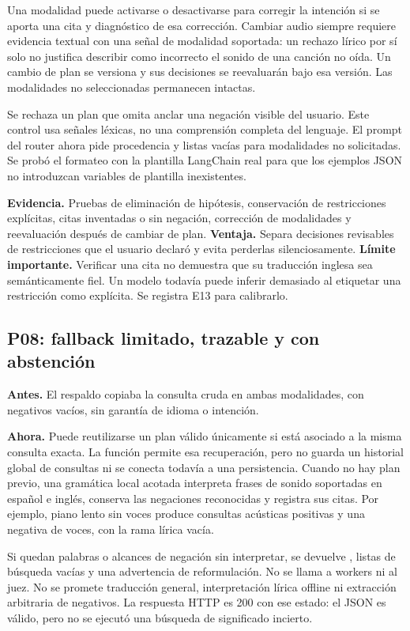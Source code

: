 Una modalidad puede activarse o desactivarse para corregir la intención si se
aporta una cita y diagnóstico de esa corrección. Cambiar audio siempre requiere
evidencia textual con una señal de modalidad soportada: un rechazo lírico por
sí solo no justifica describir como incorrecto el sonido de una canción no oída.
Un cambio de plan se versiona y sus decisiones se reevaluarán bajo esa versión.
Las modalidades no seleccionadas permanecen intactas.

Se rechaza un plan que omita anclar una negación visible del usuario. Este
control usa señales léxicas, no una comprensión completa del lenguaje. El prompt
del router ahora pide procedencia y listas vacías para modalidades no solicitadas.
Se probó el formateo con la plantilla LangChain real para que los ejemplos JSON
no introduzcan variables de plantilla inexistentes.

\textbf{Evidencia.} Pruebas de eliminación de hipótesis, conservación de
restricciones explícitas, citas inventadas o sin negación, corrección de
modalidades y reevaluación después de cambiar de plan.
\textbf{Ventaja.} Separa decisiones revisables de restricciones que el usuario
declaró y evita perderlas silenciosamente.
\textbf{Límite importante.} Verificar una cita no demuestra que su traducción
inglesa sea semánticamente fiel. Un modelo todavía puede inferir demasiado al
etiquetar una restricción como explícita. Se registra E13 para calibrarlo.

\subsection{P08: fallback limitado, trazable y con abstención}
\textbf{Antes.} El respaldo copiaba la consulta cruda en ambas modalidades,
con negativos vacíos, sin garantía de idioma o intención.

\textbf{Ahora.} Puede reutilizarse un plan válido únicamente si está asociado
a la misma consulta exacta. La función permite esa recuperación, pero no guarda
un historial global de consultas ni se conecta todavía a una persistencia.
Cuando no hay plan previo, una gramática local acotada interpreta frases de
sonido soportadas en español e inglés, conserva las negaciones reconocidas y
registra sus citas. Por ejemplo, piano lento sin voces produce consultas
acústicas positivas y una negativa de voces, con la rama lírica vacía.

Si quedan palabras o alcances de negación sin interpretar, se devuelve
, listas de búsqueda vacías y una advertencia de
reformulación. No se llama a workers ni al juez. No se promete traducción
general, interpretación lírica offline ni extracción arbitraria de negativos.
La respuesta HTTP es 200 con ese estado: el JSON es válido, pero no se ejecutó
una búsqueda de significado incierto.

